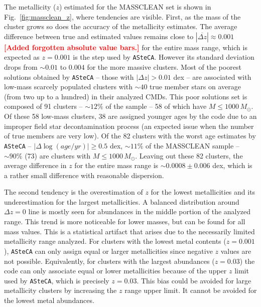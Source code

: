 \documentclass[draft]{aa}
\newcommand{\LEt}[1]{\textcolor{red}{\textbf{[#1]}}}
\begin{document}
\begin{appendix}
The metallicity ($z$) estimated for the MASSCLEAN set is shown in
Fig.~\ref{fig:massclean_z}, where tendencies are visible.
%
First, as the mass of the cluster grows so does the accuracy of the
metallicity estimates. The average difference between true and
estimated values remains close to $|\overline{\Delta z}|{\approx}0.001$ \LEt
{Added forgotten absolute value bars.} for the
entire mass range, which is expected as $z{=}0.001$ is the step used by
\texttt{ASteCA}. However its standard deviation drops from ${\sim}0.01$ to
$0.004$ for the more massive clusters.
%
%
Most of the poorest solutions obtained by \texttt{ASteCA} -- those with
$|\Delta z|{>}0.01$ dex -- are associated with low-mass scarcely populated
clusters with ${\sim}40$ true member stars on average (from two up to a
hundred) in their analyzed CMDs. This poor solutions set is composed of 91
clusters -- ${\sim}12\%$ of the sample -- 58 of which have
$M{\le}1000\,M_{\odot}$.
%
Of these 58 low-mass clusters, 38 are assigned younger ages by the code due to
an improper field star decontamination process (an expected issue when the
number of true members are very low).
%
Of the 82 clusters with the worst age estimates by \texttt{ASteCA} --
$|\Delta\log(age/yr)|{\ge}0.5$ dex, ${\sim}11\%$ of the MASSCLEAN sample --
${\sim}90\%$ (73) are clusters with $M{\le}1000\,M_{\odot}$.
%
Leaving out these 82 clusters, the average difference in $z$
for the entire mass range is ${\sim}0.0008{\pm}0.006$ dex, which is a rather
small difference with reasonable dispersion.

The second tendency is the overestimation of $z$ for the lowest metallicities
and its underestimation for the largest metallicities.
A balanced distribution around $\Delta z{=}0$ line is mostly seen for
abundances in the middle portion of the analyzed range. This trend is more
noticeable for lower masses, but can be found for all mass values.
%
This is a statistical artifact that arises due to the necessarily limited
metallicity range analyzed. For clusters with the lowest metal contents ($z
{=}0.001$), \texttt{ASteCA} can only assign equal or larger metallicities since
negative $z$ values are not possible.
Equivalently, for clusters with the largest abundances ($z{=}0.03$) the code
can only associate equal or lower metallicities because of the upper
$z$ limit used by \texttt{ASteCA}, which is precisely $z{=}0.03$.
This bias could be avoided for large metallicity clusters by
increasing the $z$ range upper limit. It cannot be avoided for the lowest metal
abundances.\\


\end{appendix}
\end{document}
